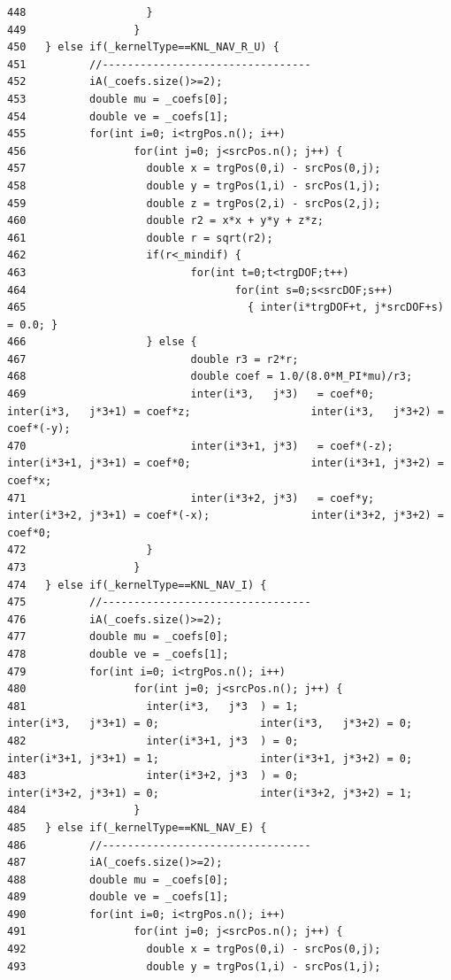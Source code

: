 \begin{verbatim}
448                   }
449                 }
450   } else if(_kernelType==KNL_NAV_R_U) {
451          //---------------------------------
452          iA(_coefs.size()>=2);
453          double mu = _coefs[0];
454          double ve = _coefs[1];
455          for(int i=0; i<trgPos.n(); i++)
456                 for(int j=0; j<srcPos.n(); j++) {
457                   double x = trgPos(0,i) - srcPos(0,j);
458                   double y = trgPos(1,i) - srcPos(1,j);
459                   double z = trgPos(2,i) - srcPos(2,j);
460                   double r2 = x*x + y*y + z*z;
461                   double r = sqrt(r2);
462                   if(r<_mindif) {
463                          for(int t=0;t<trgDOF;t++)
464                                 for(int s=0;s<srcDOF;s++)
465                                   { inter(i*trgDOF+t, j*srcDOF+s) = 0.0; }
466                   } else {
467                          double r3 = r2*r;
468                          double coef = 1.0/(8.0*M_PI*mu)/r3;
469                          inter(i*3,   j*3)   = coef*0;                   inter(i*3,   j*3+1) = coef*z;                   inter(i*3,   j*3+2) = coef*(-y);
470                          inter(i*3+1, j*3)   = coef*(-z);                inter(i*3+1, j*3+1) = coef*0;                   inter(i*3+1, j*3+2) = coef*x;
471                          inter(i*3+2, j*3)   = coef*y;                   inter(i*3+2, j*3+1) = coef*(-x);                inter(i*3+2, j*3+2) = coef*0;
472                   }
473                 }
474   } else if(_kernelType==KNL_NAV_I) {
475          //---------------------------------
476          iA(_coefs.size()>=2);
477          double mu = _coefs[0];
478          double ve = _coefs[1];
479          for(int i=0; i<trgPos.n(); i++)
480                 for(int j=0; j<srcPos.n(); j++) {
481                   inter(i*3,   j*3  ) = 1;               inter(i*3,   j*3+1) = 0;                inter(i*3,   j*3+2) = 0;
482                   inter(i*3+1, j*3  ) = 0;               inter(i*3+1, j*3+1) = 1;                inter(i*3+1, j*3+2) = 0;
483                   inter(i*3+2, j*3  ) = 0;               inter(i*3+2, j*3+1) = 0;                inter(i*3+2, j*3+2) = 1;
484                 }
485   } else if(_kernelType==KNL_NAV_E) {
486          //---------------------------------
487          iA(_coefs.size()>=2);
488          double mu = _coefs[0];
489          double ve = _coefs[1];
490          for(int i=0; i<trgPos.n(); i++)
491                 for(int j=0; j<srcPos.n(); j++) {
492                   double x = trgPos(0,i) - srcPos(0,j);
493                   double y = trgPos(1,i) - srcPos(1,j);

\end{verbatim}

